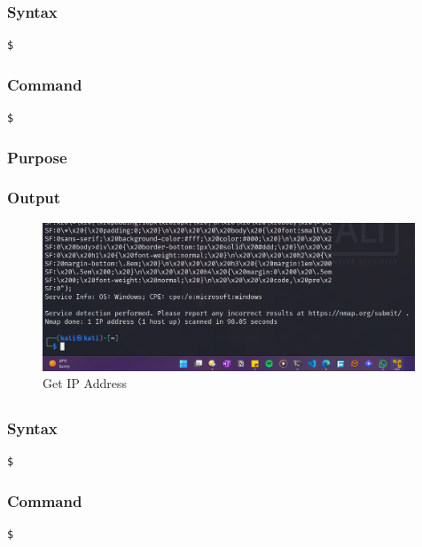 \documentclass[11pt]{article}
\begin{document}
\subsubsection*{Syntax}
\begin{verbatim}
$
\end{verbatim}

\subsubsection*{Command}
\begin{verbatim}
$
\end{verbatim}

\subsubsection*{Purpose}

\subsubsection*{Output}
\begin{figure}[H]
    \centering
    \includegraphics[width=0.99\textwidth]{a3_ss (10).png}
    \caption{Get IP Address}
    \label{fig:1}
\end{figure}
\subsection{}

\subsubsection*{Syntax}
\begin{verbatim}
$
\end{verbatim}

\subsubsection*{Command}
\begin{verbatim}
$
\end{verbatim}
\end{document}
